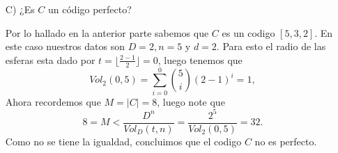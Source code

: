 \begin{itemize}
\begin{sols}
    \end{sols}
    \item[C)]¿Es $C$ un código perfecto?
    \begin{sols}
        Por lo hallado en la anterior parte sabemos que $C$ es un codigo $[5,3,2].$ En este caso nuestros datos son $D=2,n=5$ y $d=2.$ Para esto el radio de las esferas esta dado por $t=\lfloor\frac{2-1}{2}\rfloor=0$, luego tenemos que
        $$Vol_2(0,5)=\sum_{i=0}^0\binom{5}{i}(2-1)^i=1,$$ Ahora recordemos que $M=|C|=8$, luego note que
        $$8=M<\frac{D^n}{Vol_D(t,n)}=\frac{2^5}{Vol_2(0,5)}=32.$$
        Como no se tiene la igualdad, concluimos que el codigo $C$ no es perfecto.

    \end{sols}
\end{itemize}
